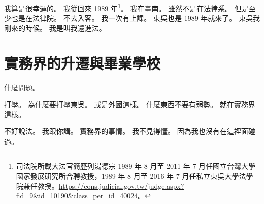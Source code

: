 \hypertarget{c01:cue:3994}{}我算是很幸運的。
\hypertarget{c01:cue:3995}{}我從回來 1989 年\footnote{司法院所載大法官簡歷列湯德宗 1989 年 8 月至 2011 年 7 月任國立台灣大學國家發展研究所合聘教授，1989 年 8 月至 2016 年 7 月任私立東吳大學法學院兼任教授。\url{https://cons.judicial.gov.tw/judge.aspx?fid=9&id=10190&class_per_id=40024}。}。
\hypertarget{c01:cue:3996}{}我在臺南。
\hypertarget{c01:cue:3997}{}雖然不是在法律系。
\hypertarget{c01:cue:3998}{}但是至少也是在法律院。
\hypertarget{c01:cue:3999}{}不去入客。
\hypertarget{c01:cue:4000}{}我一次有上課。
\hypertarget{c01:cue:4001}{}東吳也是 1989 年就來了。
\hypertarget{c01:cue:4002}{}東吳我剛來的時候。
\hypertarget{c01:cue:4003}{}我是叫我還進法。

\section{實務界的升遷與畢業學校}

\hypertarget{c01:cue:4004}{}什麼問題。

\hypertarget{c01:cue:4005}{}打壓。
\hypertarget{c01:cue:4006}{}為什麼要打壓東吳。
\hypertarget{c01:cue:4007}{}或是外國這樣。
\hypertarget{c01:cue:4008}{}什麼東西不要有弱勢。
\hypertarget{c01:cue:4009}{}就在實務界這樣。

\hypertarget{c01:cue:4010}{}不好說法。
\hypertarget{c01:cue:4011}{}我跟你講。
\hypertarget{c01:cue:4012}{}實務界的事情。
\hypertarget{c01:cue:4013}{}我不見得懂。
\hypertarget{c01:cue:4014}{}因為我也沒有在這裡面碰過。

